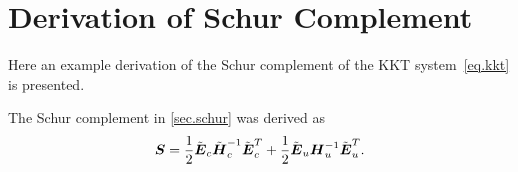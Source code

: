 \chapter{Derivation of Schur Complement}
\label{app.Schur}
Here an example derivation of the Schur complement of the \ac{KKT} 
system~\eqref{eq.kkt} is presented.

The Schur complement in \cref{sec.schur} was derived as
\begin{align*}
\mbox{\boldmath $S$} = \frac{1}{2}\tilde{\mbox{\boldmath $E$}}_c\tilde{\mbox{\boldmath $H$}}_c^{-1}\tilde{\mbox{\boldmath $E$}}_c^T 
+ \frac{1}{2}\tilde{\mbox{\boldmath $E$}}_u\mbox{\boldmath $H$}_u^{-1}\tilde{\mbox{\boldmath $E$}}_u^T.
\end{align*}

